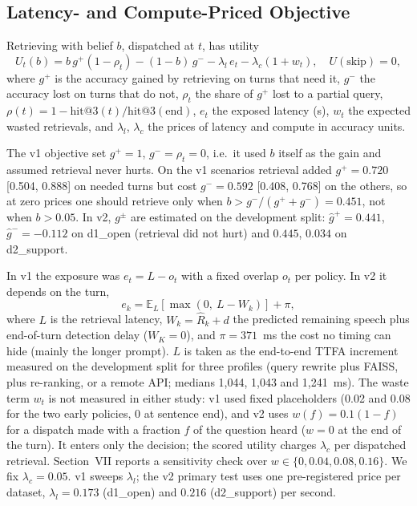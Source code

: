 \subsection{Latency- and Compute-Priced Objective}
\label{subsec:priced_objective}

Retrieving with belief $b$, dispatched at $t$, has utility
\begin{equation}
U_t(b)=b\,g^{+}(1-\rho_t)-(1-b)\,g^{-}-\lambda_l\,e_t-\lambda_c(1+w_t),
\quad U(\text{skip})=0,
\label{eq:obj}
\end{equation}
where $g^{+}$ is the accuracy gained by retrieving on turns that need it,
$g^{-}$ the accuracy lost on turns that do not, $\rho_t$ the share of $g^{+}$
lost to a partial query, $\rho(t)=1-\text{hit@3}(t)/\text{hit@3}(\text{end})$,
$e_t$ the exposed latency (s), $w_t$ the expected wasted retrievals, and
$\lambda_l$, $\lambda_c$ the prices of latency and compute in accuracy units.

The v1 objective set $g^{+}=1$, $g^{-}=\rho_t=0$, i.e.\ it used $b$ itself as
the gain and assumed retrieval never hurts. On the v1 scenarios retrieval
added $g^{+}=0.720$ [0.504, 0.888] on needed turns but cost $g^{-}=0.592$
[0.408, 0.768] on the others, so at zero prices one should retrieve only when
$b>g^{-}/(g^{+}+g^{-})=0.451$, not when $b>0.05$. In v2, $g^{\pm}$ are
estimated on the development split: $\hat g^{+}=0.441$, $\hat g^{-}=-0.112$
on d1\_open (retrieval did not hurt) and $0.445$, $0.034$ on d2\_support.

In v1 the exposure was $e_t=L-o_t$ with a fixed overlap $o_t$ per policy. In
v2 it depends on the turn,
\begin{equation}
e_k=\mathbb{E}_L\!\left[\max(0,\ L-W_k)\right]+\pi,
\label{eq:exposure}
\end{equation}
where $L$ is the retrieval latency, $W_k=\hat R_k+d$ the predicted remaining
speech plus end-of-turn detection delay ($W_K=0$), and $\pi=371$~ms the cost
no timing can hide (mainly the longer prompt). $L$ is taken as the end-to-end
TTFA increment measured on the development split for three profiles (query
rewrite plus FAISS, plus re-ranking, or a remote API; medians 1{,}044,
1{,}043 and 1{,}241~ms). The waste term $w_t$ is not measured in either
study: v1 used fixed placeholders (0.02 and 0.08 for the two early policies,
0 at sentence end), and v2 uses $w(f)=0.1(1-f)$ for a dispatch made with a
fraction $f$ of the question heard ($w=0$ at the end of the turn). It enters
only the decision; the scored utility charges $\lambda_c$ per dispatched
retrieval. Section~VII reports a sensitivity check over
$w\in\{0,0.04,0.08,0.16\}$. We fix
$\lambda_c=0.05$. v1 sweeps $\lambda_l$; the v2 primary test uses one
pre-registered price per dataset, $\lambda_l=0.173$ (d1\_open) and $0.216$
(d2\_support) per second.

